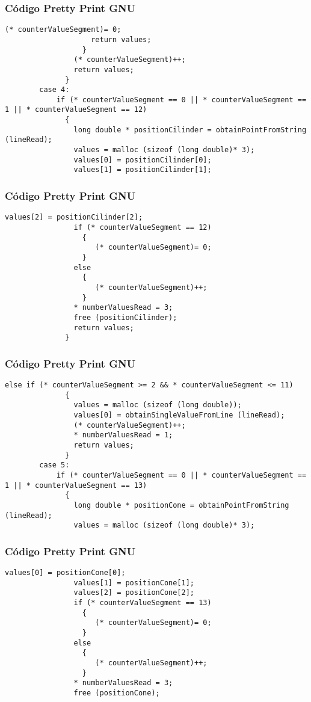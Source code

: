 \documentclass{beamer}
\begin{document}
\begin{frame}[fragile]
\frametitle{C\'odigo Pretty Print GNU}
\begin{lstlisting}[style=CStyle]
                     (* counterValueSegment)= 0;
                    return values;
                  }
                (* counterValueSegment)++;
                return values;
              }
        case 4:
            if (* counterValueSegment == 0 || * counterValueSegment == 1 || * counterValueSegment == 12)
              {
                long double * positionCilinder = obtainPointFromString (lineRead);
                values = malloc (sizeof (long double)* 3);
                values[0] = positionCilinder[0];
                values[1] = positionCilinder[1];
\end{lstlisting}
\end{frame}
\begin{frame}[fragile]
\frametitle{C\'odigo Pretty Print GNU}
\begin{lstlisting}[style=CStyle]
                values[2] = positionCilinder[2];
                if (* counterValueSegment == 12)
                  {
                     (* counterValueSegment)= 0;
                  }
                else
                  {
                     (* counterValueSegment)++;
                  }
                * numberValuesRead = 3;
                free (positionCilinder);
                return values;
              }
\end{lstlisting}
\end{frame}
\begin{frame}[fragile]
\frametitle{C\'odigo Pretty Print GNU}
\begin{lstlisting}[style=CStyle]
            else if (* counterValueSegment >= 2 && * counterValueSegment <= 11)
              {
                values = malloc (sizeof (long double));
                values[0] = obtainSingleValueFromLine (lineRead);
                (* counterValueSegment)++;
                * numberValuesRead = 1;
                return values;
              }
        case 5:
            if (* counterValueSegment == 0 || * counterValueSegment == 1 || * counterValueSegment == 13)
              {
                long double * positionCone = obtainPointFromString (lineRead);
                values = malloc (sizeof (long double)* 3);
\end{lstlisting}
\end{frame}
\begin{frame}[fragile]
\frametitle{C\'odigo Pretty Print GNU}
\begin{lstlisting}[style=CStyle]
                values[0] = positionCone[0];
                values[1] = positionCone[1];
                values[2] = positionCone[2];
                if (* counterValueSegment == 13)
                  {
                     (* counterValueSegment)= 0;
                  }
                else
                  {
                     (* counterValueSegment)++;
                  }
                * numberValuesRead = 3;
                free (positionCone);
\end{lstlisting}
\end{frame}
\end{document}
